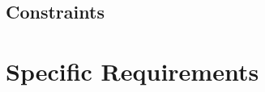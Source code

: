 \documentclass[12pt]{article} %
\begin{document}
\subsection{Constraints}







\section{Specific Requirements}

\end{document}
